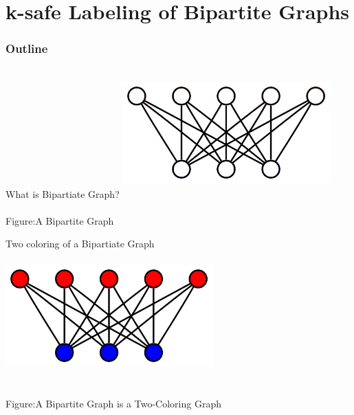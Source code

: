\documentclass{beamer}
\begin{document}
		\section{k-safe Labeling of Bipartite  Graphs}
		\begin{frame}
			\frametitle{Outline}
			\tableofcontents[currentsection]
		\end{frame}
		\begin{frame}{What is Bipartiate Graph?}
			\centering
			\includegraphics[height=5cm,width=8cm]{nocolor.png}
			\\~\\
			Figure:A Bipartite Graph
		\end{frame}
		\begin{frame}{Two coloring of a Bipartiate Graph}
			\centering
			\includegraphics[height=5cm,width=8cm]{twocolor.png}
			\\~\\
			Figure:A Bipartite Graph is a Two-Coloring Graph
		\end{frame}
\end{document}
